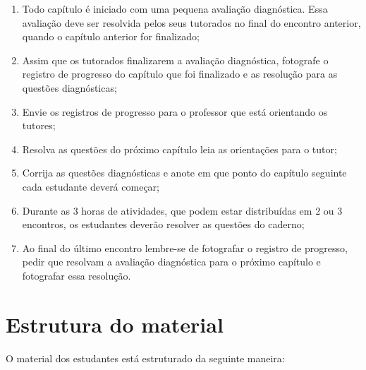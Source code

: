 \documentclass[openany]{book}
\begin{document}
\begin{enumerate}
 \item Todo capítulo é iniciado com uma pequena avaliação diagnóstica. Essa avaliação deve ser resolvida pelos seus tutorados no final do encontro anterior, quando o capítulo anterior for finalizado;
 \item Assim que os tutorados finalizarem a avaliação diagnóstica, fotografe o registro de progresso do capítulo que foi finalizado e as resolução para as questões diagnósticas;
 \item Envie os registros de progresso para o professor que está orientando os tutores;
 \item Resolva as questões do próximo capítulo leia as orientações para o tutor;
 \item Corrija as questões diagnósticas e anote em que ponto do capítulo seguinte cada estudante deverá começar;
 \item Durante as 3 horas de atividades, que podem estar distribuídas em 2 ou 3 encontros, os estudantes deverão resolver as questões do caderno;
 \item Ao final do último encontro lembre-se de fotografar o registro de progresso, pedir que resolvam a avaliação diagnóstica para o próximo capítulo e fotografar essa resolução.
\end{enumerate}

\section{Estrutura do material}

O material dos estudantes está estruturado da seguinte maneira:
\end{document}
